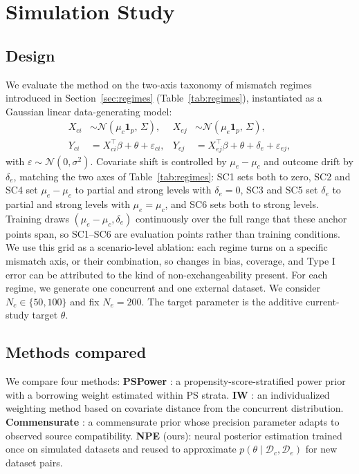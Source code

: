 \section{Simulation Study}
\label{sec:simulation}

\subsection{Design}
We evaluate the method on the two-axis taxonomy of mismatch regimes
introduced in Section~\ref{sec:regimes} (Table~\ref{tab:regimes}),
instantiated as a Gaussian linear data-generating model:
\begin{align}
  X_{ci} &\sim \mathcal{N}(\mu_c \mathbf{1}_p,\, \Sigma), &
  X_{ej} &\sim \mathcal{N}(\mu_e \mathbf{1}_p,\, \Sigma), \\
  Y_{ci} &= X_{ci}^\top \beta + \theta + \varepsilon_{ci}, &
  Y_{ej} &= X_{ej}^\top \beta + \theta + \delta_e + \varepsilon_{ej},
\end{align}
with $\varepsilon \sim \mathcal{N}(0, \sigma^2)$.
Covariate shift is controlled by $\mu_e - \mu_c$ and outcome drift by
$\delta_e$, matching the two axes of Table~\ref{tab:regimes}:
SC1 sets both to zero, SC2 and SC4 set $\mu_e-\mu_c$ to partial and
strong levels with $\delta_e=0$, SC3 and SC5 set $\delta_e$ to partial
and strong levels with $\mu_e=\mu_c$, and SC6 sets both to strong
levels. Training draws $(\mu_e-\mu_c, \delta_e)$ continuously over the
full range that these anchor points span, so SC1--SC6 are evaluation
points rather than training conditions. We use this grid as a scenario-level
ablation: each regime turns on a specific mismatch axis, or their
combination, so changes in bias, coverage, and Type I error can be attributed
to the kind of non-exchangeability present.
For each regime, we generate one concurrent and one external dataset.
We consider $N_c \in \{50,100\}$ and fix $N_e=200$.
The target parameter is the additive current-study target $\theta$.

\subsection{Methods compared}
We compare four methods:
\textbf{PSPower} \citep{ibrahim2015power}: a
    propensity-score-stratified power prior with a borrowing weight estimated
    within PS strata.
  \textbf{IW} \citep{chesnaye2022introduction}: an individualized
    weighting method based on covariate distance from the concurrent
    distribution.
\textbf{Commensurate} \citep{hobbs2011commensurate}: a
    commensurate prior whose precision parameter adapts to observed
    source compatibility.
\textbf{NPE} (ours): neural posterior estimation trained
    once on simulated datasets and reused to approximate
    $p(\theta \mid \mathcal{D}_c, \mathcal{D}_e)$ for new dataset pairs.


